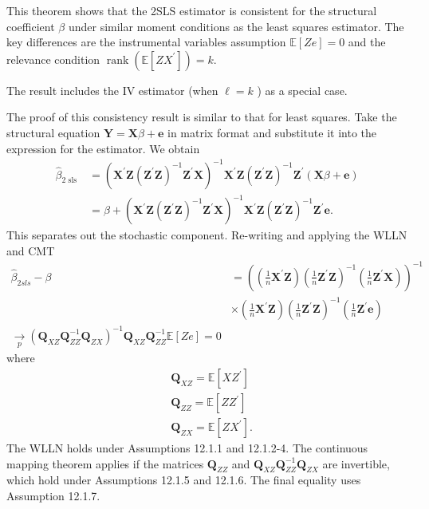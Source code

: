\documentclass[10pt]{article}
\begin{document}
This theorem shows that the 2SLS estimator is consistent for the structural coefficient $\beta$ under similar moment conditions as the least squares estimator. The key differences are the instrumental variables assumption $\mathbb{E}[Z e]=0$ and the relevance condition $\operatorname{rank}\left(\mathbb{E}\left[Z X^{\prime}\right]\right)=k$.

The result includes the IV estimator (when $\ell=k$ ) as a special case.

The proof of this consistency result is similar to that for least squares. Take the structural equation $\boldsymbol{Y}=\boldsymbol{X} \beta+\boldsymbol{e}$ in matrix format and substitute it into the expression for the estimator. We obtain
$$
\begin{aligned}
\widehat{\beta}_{2 \text { sls }} &=\left(\boldsymbol{X}^{\prime} \boldsymbol{Z}\left(\boldsymbol{Z}^{\prime} \boldsymbol{Z}\right)^{-1} \boldsymbol{Z}^{\prime} \boldsymbol{X}\right)^{-1} \boldsymbol{X}^{\prime} \boldsymbol{Z}\left(\boldsymbol{Z}^{\prime} \boldsymbol{Z}\right)^{-1} \boldsymbol{Z}^{\prime}(\boldsymbol{X} \beta+\boldsymbol{e}) \\
&=\beta+\left(\boldsymbol{X}^{\prime} \boldsymbol{Z}\left(\boldsymbol{Z}^{\prime} \boldsymbol{Z}\right)^{-1} \boldsymbol{Z}^{\prime} \boldsymbol{X}\right)^{-1} \boldsymbol{X}^{\prime} \boldsymbol{Z}\left(\boldsymbol{Z}^{\prime} \boldsymbol{Z}\right)^{-1} \boldsymbol{Z}^{\prime} \boldsymbol{e} .
\end{aligned}
$$
This separates out the stochastic component. Re-writing and applying the WLLN and CMT
$$
\begin{aligned}
\widehat{\beta}_{2 s l s}-\beta &=\left(\left(\frac{1}{n} \boldsymbol{X}^{\prime} \boldsymbol{Z}\right)\left(\frac{1}{n} \boldsymbol{Z}^{\prime} \boldsymbol{Z}\right)^{-1}\left(\frac{1}{n} \boldsymbol{Z}^{\prime} \boldsymbol{X}\right)\right)^{-1} \\
& \times\left(\frac{1}{n} \boldsymbol{X}^{\prime} \boldsymbol{Z}\right)\left(\frac{1}{n} \boldsymbol{Z}^{\prime} \boldsymbol{Z}\right)^{-1}\left(\frac{1}{n} \boldsymbol{Z}^{\prime} \boldsymbol{e}\right) \\
\underset{p}{\rightarrow}\left(\boldsymbol{Q}_{X Z} \boldsymbol{Q}_{Z Z}^{-1} \boldsymbol{Q}_{Z X}\right)^{-1} \boldsymbol{Q}_{X Z} \boldsymbol{Q}_{Z Z}^{-1} \mathbb{E}[Z e]=0
\end{aligned}
$$
where
$$
\begin{aligned}
&\boldsymbol{Q}_{X Z}=\mathbb{E}\left[X Z^{\prime}\right] \\
&\boldsymbol{Q}_{Z Z}=\mathbb{E}\left[Z Z^{\prime}\right] \\
&\boldsymbol{Q}_{Z X}=\mathbb{E}\left[Z X^{\prime}\right] .
\end{aligned}
$$
The WLLN holds under Assumptions 12.1.1 and 12.1.2-4. The continuous mapping theorem applies if the matrices $\boldsymbol{Q}_{Z Z}$ and $\boldsymbol{Q}_{X Z} \boldsymbol{Q}_{Z Z}^{-1} \boldsymbol{Q}_{Z X}$ are invertible, which hold under Assumptions 12.1.5 and 12.1.6. The final equality uses Assumption 12.1.7.
\end{document}
